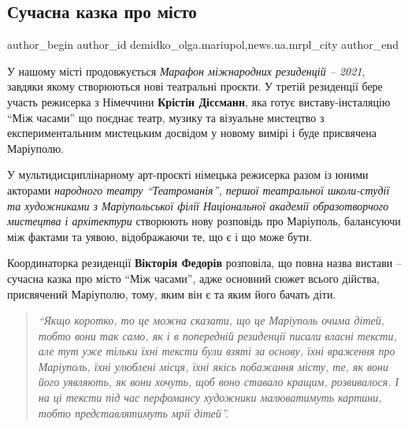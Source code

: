  
 
 
 
 
 
\subsection{Сучасна казка про місто}
\label{sec:16_10_2021.stz.news.ua.mrpl_city.1.suchasna_kazka_pro_misto}
 
\ifcmt
 author_begin
   author_id demidko_olga.mariupol,news.ua.mrpl_city
 author_end
\fi


У нашому місті продовжується \emph{Марафон міжнародних резиденцій – 2021}, завдяки
якому створюються нові театральні проєкти. У третій резиденції бере участь
режисерка з Німеччини \textbf{Крістін Діссманн}, яка готує виставу-інсталяцію \enquote{Між
часами} що поєднає театр, музику та візуальне мистецтво з експериментальним
мистецьким досвідом у новому вимірі і буде присвячена Маріуполю.


У мультидисциплінарному арт-проєкті німецька режисерка разом із юними акторами
\emph{народного театру \enquote{Театроманія}, першої театральної школи-студії та художниками
з Маріупольської філії Національної академії образотворчого мистецтва і
архітектури} створюють нову розповідь про Маріуполь, балансуючи між фактами та
уявою, відображаючи те, що є і що може бути.


Координаторка резиденції \textbf{Вікторія Федорів} розповіла, що повна назва вистави –
сучасна казка про місто \enquote{Між часами}, адже основний сюжет всього дійства,
присвячений Маріуполю, тому, яким він є та яким його бачать діти. 

\begin{quote}
\em\enquote{Якщо коротко, то це можна сказати, що це Маріуполь очима дітей,
тобто вони так само, як і в попередній резиденції писали власні тексти,
але тут уже тільки їхні тексти були взяті за основу, їхні враження про
Маріуполь, їхні улюблені місця, їхні якісь побажання місту, те, як вони
його уявляють, як вони хочуть, щоб воно ставало кращим, розвивалося. І
на ці тексти під час перфомансу художники малюватимуть картини, тобто
представлятимуть мрії дітей}.
\end{quote}

